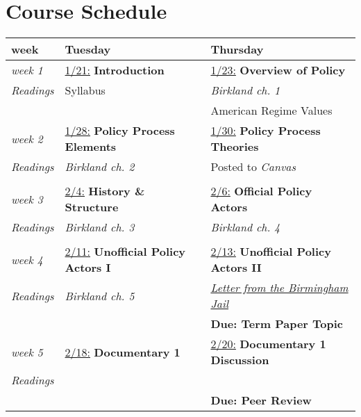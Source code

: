 \documentclass[11pt, letterpaper]{article}
\begin{document}
\section{Course Schedule}

\begin{center}
\begin{longtable}{p{2cm} | p{6.8cm} | p{6.8cm}}	
	\label{tab:schedule} \\
    \large{\textbf{week}} & \large{\textbf{Tuesday}} & \large{\textbf{Thursday}} \\ \hline \hline

    \emph{week 1} & \underline{1/21:} \textbf{Introduction} & \underline{1/23:} \textbf{Overview of Policy} \\
    \emph{Readings} & Syllabus & \textit{Birkland ch. 1} \\
    & & American Regime Values \\\hline
    
    \emph{week 2} & \underline{1/28:} \textbf{Policy Process Elements} & \underline{1/30:} \textbf{Policy Process Theories} \\
    \emph{Readings} & \textit{Birkland ch. 2} & Posted to \textit{Canvas} \\
    & & \\\hline
    
    \emph{week 3} & \underline{2/4:} \textbf{History \& Structure} & \underline{2/6:} \textbf{Official Policy Actors} \\
    \emph{Readings} & \textit{Birkland ch. 3} & \textit{Birkland ch. 4}\\
    & &  \\\hline
    
    \emph{week 4} & \underline{2/11:} \textbf{Unofficial Policy Actors I} & \underline{2/13:} \textbf{Unofficial Policy Actors II} \\
    \emph{Readings} & \textit{Birkland ch. 5} & \href{https://www.csuchico.edu/iege/_assets/documents/susi-letter-from-birmingham-jail.pdf}{\textit{Letter from the Birmingham Jail}} \\
    & & \textbf{Due: Term Paper Topic} \\\hline
    
    \emph{week 5} & \underline{2/18:} \textbf{Documentary 1} & \underline{2/20:} \textbf{Documentary 1 Discussion} \\
    \emph{Readings} & & \\
    & & \textbf{Due: Peer Review} \\\hline
    

\end{longtable}
\end{center}
\end{document}
